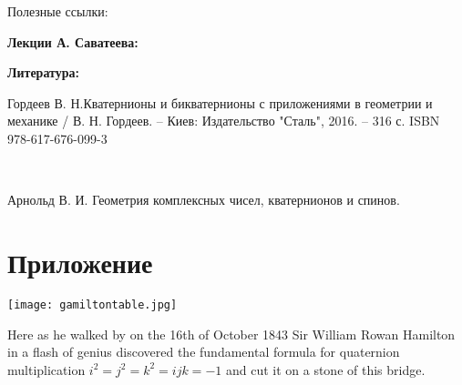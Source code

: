 \documentclass[10pt]{beamer}
\begin{document}
	

	\begin{frame} {Полезные ссылки:}
		
		{
			\textbf{Лекции А. Саватеева:}
			
			
			
			
			
			\textbf{Литература: }
			
		}
		{
			 
			 Гордеев В. Н.Кватернионы и бикватернионы с приложениями в геометрии и
			 механике / В. Н. Гордеев. – Киев: Издательство "Сталь", 2016. – 316 с.
			 ISBN 978-617-676-099-3
			 
			 ~
			 
			 Арнольд В. И. Геометрия комплексных чисел, кватернионов и спинов.
		}

		
	\end{frame}
	
 \appendix
 
 \section{Приложение}
 
 \begin{frame}\hypertarget{frame:gam_table}{}
 	
 	{
 		\texttt{[image: gamiltontable.jpg]}
 	}
 	
    	Here as he walked by on the 16th of October 1843 Sir William Rowan Hamilton in a flash of genius discovered the fundamental formula for quaternion multiplication $i^2 = j^2 = k^2 = ijk = −1$ and cut it on a stone of this bridge.
 	
  		\hfill 	\hyperlink{frame:quaternion}{}
 	
 \end{frame}
 
 
 
 
\begin{comment}
	
\end{comment}
 
\end{document}
